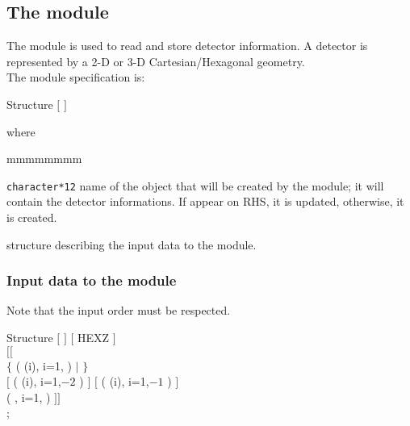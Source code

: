 \subsection{The  module}\label{sect:tinst}

\vskip 0.2cm
The  module is used to read and store detector information. 
A detector is represented by a 2-D or 3-D Cartesian/Hexagonal geometry.\\

\noindent
The  module specification is:

\begin{DataStructure}{Structure }
 \moc{:=} 
$[$  $]$ \moc{::} 
\end{DataStructure}

\noindent where

\begin{ListeDeDescription}{mmmmmmmm}

\item[\dusa{DETECT}] \texttt{character*12} name of the  object
that will be created by the module; it will contain the detector informations.
If  appear on RHS, it is updated, otherwise, it is created.

\item[\dstr{descdev}] structure describing the input data to the
 module.

\end{ListeDeDescription}

\vskip 0.2cm
\subsubsection{Input data to the  module}\label{sect:strtinst}

\noindent
Note that the input order must be respected. \\
\begin{DataStructure}{Structure }
$[$   $]$ $[$ HEXZ $]$
  \\
$[[$   \\
  
$\{$  ( (i), i=1, ) $|$
 $\}$  \\ 
$[$  ( (i), i=1,$-2$ ) $]$
$[$  ( (i), i=1,$-1$ ) $]$ \\
( , i=1, ) $]]$ \\
;
\end{DataStructure}

